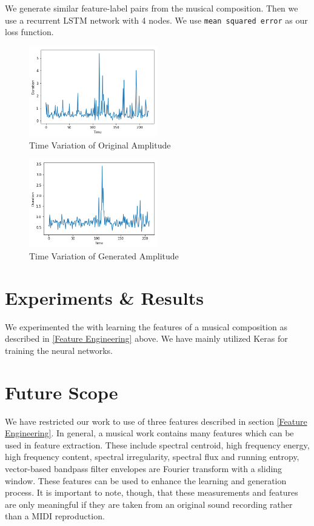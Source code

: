 \documentclass[conference]{IEEEtran}
\begin{document}
We generate similar feature-label pairs from the musical composition. Then we use a recurrent LSTM network with 4 nodes. We use \texttt{mean squared error} as our loss function.
\begin{figure}[h]
\includegraphics[width=0.5\textwidth]{IEEEtran/rest_o.png}
\caption{Time Variation of Original Amplitude}
\label{fig:figure5}
\end{figure}

\begin{figure}[h]
\includegraphics[width=0.5\textwidth]{IEEEtran/rest_g.png}
\caption{Time Variation of Generated Amplitude}
\label{fig:figure6}
\end{figure}

\section{Experiments \& Results}
We experimented the with learning the features of a musical composition as described in \ref{Feature Engineering} above. We have mainly utilized Keras \cite{keras} for training the neural networks.

\section{Future Scope}
We have restricted our work to use of three features described in section \ref{Feature Engineering}. In general, a musical work contains many features which can be used in feature extraction. These include spectral centroid, high frequency energy, high frequency content, spectral irregularity, spectral flux and running entropy, vector-based bandpass filter envelopes are Fourier transform with a sliding window.\cite{Jensen} These features can be used to enhance the learning and generation process. It is important to note, though, that these measurements and features are only meaningful if they are taken from an original sound recording rather than a MIDI reproduction.\\
\end{document}
